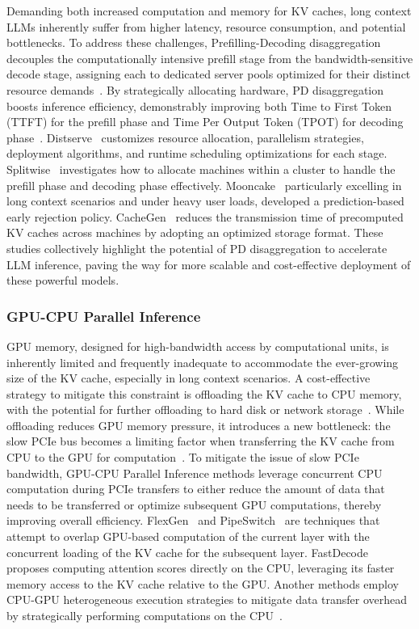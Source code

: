 \documentclass[11pt, a4paper, logo, copyright, nonumbering]{map}
\begin{document}
Demanding both increased computation and memory for KV caches, long context LLMs inherently suffer from higher latency, resource consumption, and potential bottlenecks. To address these challenges, Prefilling-Decoding disaggregation decouples the computationally intensive prefill stage from the bandwidth-sensitive decode stage, assigning each to dedicated server pools optimized for their distinct resource demands~\citep{patel2024splitwise,qin2024mooncake}. By strategically allocating hardware, PD disaggregation boosts inference efficiency, demonstrably improving both Time to First Token (TTFT) for the prefill phase and Time Per Output Token (TPOT) for decoding phase~\citep{zhong2024distserve}.
Distserve~\citep{zhong2024distserve} customizes resource allocation, parallelism strategies, deployment algorithms, and runtime scheduling optimizations for each stage. Splitwise~\citep{patel2024splitwise} investigates how to allocate machines within a cluster to handle the prefill phase and decoding phase effectively. Mooncake~\citep{qin2024mooncake} particularly excelling in long context scenarios and under heavy user loads, developed a prediction-based early rejection policy. CacheGen~\citep{liu2024cachegen} reduces the transmission time of precomputed KV caches across machines by adopting an optimized storage format. These studies collectively highlight the potential of PD disaggregation to accelerate LLM inference, paving the way for more scalable and cost-effective deployment of these powerful models.

\subsubsection{GPU-CPU Parallel Inference} GPU memory, designed for high-bandwidth access by computational units, is inherently limited and frequently inadequate to accommodate the ever-growing size of the KV cache, especially in long context scenarios. A cost-effective strategy to mitigate this constraint is offloading the KV cache to CPU memory, with the potential for further offloading to hard disk or network storage~\citep{xuanlei2024hetegen,jiang2024efficient}. While offloading reduces GPU memory pressure, it introduces a new bottleneck: the slow PCIe bus becomes a limiting factor when transferring the KV cache from CPU to the GPU for computation~\citep{yu2024twinpilots,he2024fastdecode}. To mitigate the issue of slow PCIe bandwidth, GPU-CPU Parallel Inference methods leverage concurrent CPU computation during PCIe transfers to either reduce the amount of data that needs to be transferred or optimize subsequent GPU computations, thereby improving overall efficiency. FlexGen~\citep{sheng2023flexgen} and PipeSwitch~\citep{bai2020pipeswitch} are techniques that attempt to overlap GPU-based computation of the current layer with the concurrent loading of the KV cache for the subsequent layer. FastDecode~\citep{he2024fastdecode} proposes computing attention scores directly on the CPU, leveraging its faster memory access to the KV cache relative to the GPU. Another methods employ CPU-GPU heterogeneous execution strategies to mitigate data transfer overhead by strategically performing computations on the CPU~\citep{xuanlei2024hetegen,yu2024twinpilots,park2024improving}.
\end{document}
